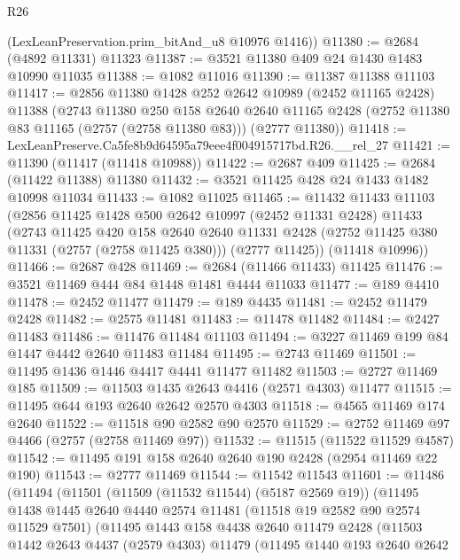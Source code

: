 \begin{lexlean}{R26}
\begin{coremodule}
      (LexLeanPreservation.prim_bitAnd_u8 @10976 @1416))
@11380 := @2684 (@4892 @11331) @11323
@11387 := @3521 @11380 @409 @24 @1430 @1483 @10990 @11035
@11388 := @1082 @11016
@11390 := @11387 @11388 @11103
@11417 := @2856
    @11380
    @1428
    @252
    @2642
    @10989
    (@2452 @11165 @2428)
    @11388
    (@2743
      @11380
      @250
      @158
      @2640
      @2640
      @11165
      @2428
      (@2752 @11380 @83 @11165 (@2757 (@2758 @11380 @83)))
      (@2777 @11380))
@11418 := LexLeanPreserve.Ca5fe8b9d64595a79eee4f004915717bd.R26.__rel_27
@11421 := @11390 (@11417 (@11418 @10988))
@11422 := @2687 @409
@11425 := @2684 (@11422 @11388) @11380
@11432 := @3521 @11425 @428 @24 @1433 @1482 @10998 @11034
@11433 := @1082 @11025
@11465 := @11432
    @11433
    @11103
    (@2856
      @11425
      @1428
      @500
      @2642
      @10997
      (@2452 @11331 @2428)
      @11433
      (@2743
        @11425
        @420
        @158
        @2640
        @2640
        @11331
        @2428
        (@2752 @11425 @380 @11331 (@2757 (@2758 @11425 @380)))
        (@2777 @11425))
      (@11418 @10996))
@11466 := @2687 @428
@11469 := @2684 (@11466 @11433) @11425
@11476 := @3521 @11469 @444 @84 @1448 @1481 @4444 @11033
@11477 := @189 @4410
@11478 := @2452 @11477
@11479 := @189 @4435
@11481 := @2452 @11479 @2428
@11482 := @2575 @11481
@11483 := @11478 @11482
@11484 := @2427 @11483
@11486 := @11476 @11484 @11103
@11494 := @3227 @11469 @199 @84 @1447 @4442 @2640 @11483 @11484
@11495 := @2743 @11469
@11501 := @11495 @1436 @1446 @4417 @4441 @11477 @11482
@11503 := @2727 @11469 @185
@11509 := @11503 @1435 @2643 @4416 (@2571 @4303) @11477
@11515 := @11495 @644 @193 @2640 @2642 @2570 @4303
@11518 := @4565 @11469 @174 @2640
@11522 := @11518 @90 @2582 @90 @2570
@11529 := @2752 @11469 @97 @4466 (@2757 (@2758 @11469 @97))
@11532 := @11515 (@11522 @11529 @4587)
@11542 := @11495 @191 @158 @2640 @2640 @190 @2428 (@2954 @11469 @22 @190)
@11543 := @2777 @11469
@11544 := @11542 @11543
@11601 := @11486
    (@11494
      (@11501
        (@11509 (@11532 @11544) (@5187 @2569 @19))
        (@11495
          @1438
          @1445
          @2640
          @4440
          @2574
          @11481
          (@11518 @19 @2582 @90 @2574 @11529 @7501)
          (@11495
            @1443
            @158
            @4438
            @2640
            @11479
            @2428
            (@11503
              @1442
              @2643
              @4437
              (@2579 @4303)
              @11479
              (@11495
                @1440
                @193
                @2640
                @2642

\end{coremodule}
\end{lexlean}
